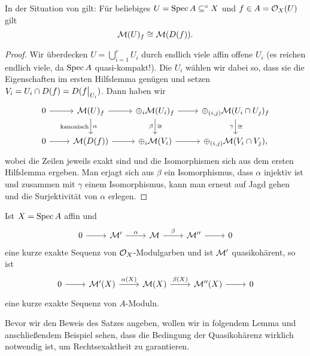 \begin{hilfslemma}
    In der Situation von 
     gilt:
    Für beliebiges $U = \operatorname{Spec} A \subseteq^\circ X$ und $f\in A = \mathcal{O}_X(U)$ gilt
    \[ \mathcal{M}(U)_f \cong \mathcal{M}(D(f)).\]
\end{hilfslemma}
\begin{proof}
    Wir überdecken $U = \bigcup_{i=1}^r U_i$ durch endlich viele affin 
    offene $U_i$ (es reichen endlich viele, da $\operatorname{Spec} A$ quasi-kompakt!).
    Die $U_i$ wählen wir dabei so, dass sie die Eigenschaften 
    im ersten Hilfslemma genügen
    und setzen $V_i = U_i \cap D(f) = D(f\big|_{U_i})$.
    Dann haben wir
    \[\begin{tikzcd}
        0 \rar & \M(U)_f \rar \dar{\alpha}[swap]{\text{kanonisch}} & 
        \oplus_i \M(U_i)_f \rar \dar{\cong}[swap]{\beta} & 
        \oplus_{(i,j)} \M(U_i \cap U_j)_f \dar{\cong}[swap]{\gamma}\\
        0 \rar & \M(D(f)) \rar & \oplus_i \M(V_i) \rar & 
        \oplus_{(i,j)} \M(V_i \cap V_j),
    \end{tikzcd}\]
    wobei die Zeilen jeweils exakt sind und die Isomorphismen sich aus
    dem ersten Hilfslemma ergeben. Man erjagt sich aus $\beta$ ein 
    Isomorphismus, dass $\alpha$ injektiv ist und zusammen mit $\gamma$
    einem Isomorphismus, kann man erneut auf Jagd gehen und
    die Surjektivität von $\alpha$ erlegen.    
\end{proof}


\begin{satz}
    \label{satz:kurze exakte sequenz mit quasikohaerent bleibt exakt}
    Ist $X = \operatorname{Spec} A$ affin und 
    \[\begin{tikzcd}
        0 \rar & \M' \rar{\alpha} & \M \rar{\beta} & \M'' \rar & 0
    \end{tikzcd}\]
    eine kurze exakte Sequenz von $\mathcal{O}_X$-Modulgarben und ist
    $\mathcal{M}'$ quasikohärent, so ist
    \[\begin{tikzcd}
        0 \rar & \M'(X) \rar{\alpha(X)} & \M(X) \rar{\beta(X)} & 
        \M''(X) \rar & 0
    \end{tikzcd}\]
    eine kurze exakte Sequenz von $A$-Moduln.
\end{satz}

Bevor wir den Beweis des Satzes angeben, wollen wir in folgendem Lemma und 
anschließendem Beispiel sehen, dass die Bedingung der Quasikohärenz wirklich
notwendig ist, um Rechtsexaktheit zu garantieren.

